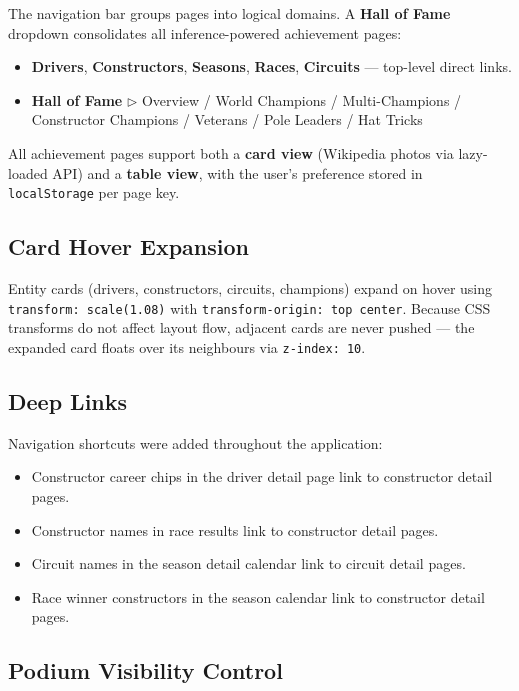 \documentclass[12pt,a4paper]{article}
\begin{document}
The navigation bar groups pages into logical domains.
A \textbf{Hall of Fame} dropdown consolidates all inference-powered achievement pages:

\begin{itemize}[leftmargin=1.5em]
  \item \textbf{Drivers}, \textbf{Constructors}, \textbf{Seasons}, \textbf{Races},
        \textbf{Circuits} --- top-level direct links.
  \item \textbf{Hall of Fame} $\triangleright$ Overview / World Champions /
        Multi-Champions / Constructor Champions / Veterans / Pole Leaders / Hat Tricks
\end{itemize}

All achievement pages support both a \textbf{card view} (Wikipedia photos via lazy-loaded
API) and a \textbf{table view}, with the user's preference stored in
\texttt{localStorage} per page key.

\subsection{Card Hover Expansion}

Entity cards (drivers, constructors, circuits, champions) expand on hover using
\texttt{transform: scale(1.08)} with \texttt{transform-origin: top center}.
Because CSS transforms do not affect layout flow, adjacent cards are never pushed
--- the expanded card floats over its neighbours via \texttt{z-index: 10}.

\subsection{Deep Links}

Navigation shortcuts were added throughout the application:
\begin{itemize}[leftmargin=1.5em]
  \item Constructor career chips in the driver detail page link to constructor detail pages.
  \item Constructor names in race results link to constructor detail pages.
  \item Circuit names in the season detail calendar link to circuit detail pages.
  \item Race winner constructors in the season calendar link to constructor detail pages.
\end{itemize}

\subsection{Podium Visibility Control}
\end{document}

